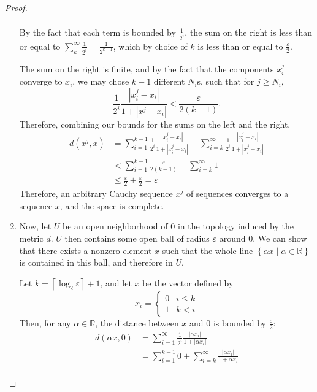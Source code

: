 \documentclass[12pt]{article}
\newcommand{\R}{\mathbb{R}}
\theoremstyle{definition}
\begin{document}
\begin{proof}
\begin{enumerate}[label=(\roman*)]
\begin{align*}
	\end{align*} 
	By the fact that each term is bounded by $\frac{1}{2^i}$, the sum on the right is less than or equal to $\sum_k^\infty \frac{1}{2^i} = \frac{1}{2^{k-1}}$, which by choice of $k$ is less than or equal to $\frac{\varepsilon}{2}$.
	\par The sum on the right is finite, and by the fact that the components $x^j_i$ converge to $x_i$, we may chose $k-1$ different $N_i$s, such that for $j \geq N_i$,
	\[ \frac{1}{2^i}\frac{\left \lvert { x^j_i - x_i } \right \lvert }{1 + \left \lvert { x^j - x_i } \right \lvert } < \frac{\varepsilon}{2(k-1)}.\]
	Therefore, combining our bounds for the sums on the left and the right,
	\begin{align*}
		d(x^j, x) &= \sum_{i = 1}^{k - 1} \frac{1}{2^i} \frac{\left \lvert { x^j_i - x_i } \right \lvert }{ 1 + \left \lvert { x^j_i - x_i } \right \lvert }+ \sum_{i = k}^\infty \frac{1}{2^i} \frac{\left \lvert { x^j_i - x_i } \right \lvert }{1 + \left \lvert { x^j_i - x_i } \right \lvert }\\
		&< \sum_{i=1}^{k-1} \frac{\varepsilon}{2(k-1)} + \sum_{i=k}^\infty 1\\
		&\leq \frac{\varepsilon}{2} + \frac{\varepsilon}{2} = \varepsilon
	\end{align*}
	Therefore, an arbitrary Cauchy sequence $x^j$ of sequences converges to a sequence $x$, and the space is complete.
\item Now, let $U$ be an open neighborhood of $0$ in the topology induced by the metric $d$. $U$ then contains some open ball of radius $\varepsilon$ around $0$. We can show that there exists a nonzero element $x$ such that the whole line $\left\{ \alpha x \mid \alpha \in \R \right\} $ is contained in this ball, and therefore in $U$.
	\par Let $k = \left \lceil \log_2 \varepsilon \right \rceil + 1$, and let $x$ be the vector defined by 
	\[x_i = \begin{cases}
			0 &i \leq k\\
			1 &k < i
\end{cases}\]
Then, for any $\alpha \in \R$, the distance between $x$ and $0$ is bounded by $\frac{\varepsilon}{2}$:
\begin{align*}
	d(\alpha x, 0) &= \sum_{i = 1}^\infty \frac{1}{2^i} \frac{\left \lvert { \alpha x_i } \right \lvert }{1 + \left \lvert { \alpha x_i } \right \lvert }\\
	&= \sum_{i=1}^{k-1} 0 + \sum_{i = k}^\infty \frac{\left \lvert { \alpha x_i  } \right \lvert }{1 + \alpha x_i}\\

\end{align*}
\end{enumerate}
\end{proof}
\end{document}
